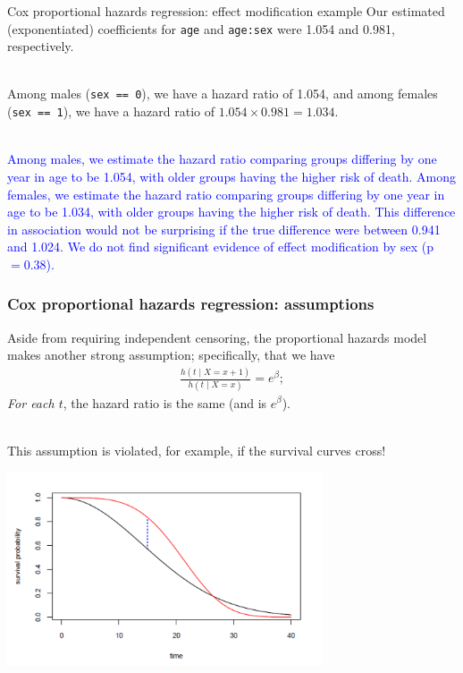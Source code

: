 \documentclass[10pt,t]{beamer}
\begin{document}
\begin{frame}{Cox proportional hazards regression: effect modification example}
	Our estimated (exponentiated) coefficients for \texttt{age} and \texttt{age:sex} were 1.054 and 0.981, respectively.
	\\ ~\ 
	
	Among males (\texttt{sex == 0}), we have a hazard ratio of 1.054, and among females (\texttt{sex == 1}), we have a hazard ratio of $1.054 \times 0.981 = 1.034$.  
	\\ ~\ 
	
	\textcolor{blue}{Among males, we estimate the hazard ratio comparing groups differing by one year in age to be 1.054, with older groups having the higher risk of death. Among females, we estimate the hazard ratio comparing groups differing by one year in age to be 1.034, with older groups having the higher risk of death. This difference in association would not be surprising if the true difference were between 0.941 and 1.024. We do not find significant evidence of effect modification by sex (p $= 0.38$).}
\end{frame}

\begin{frame}
\frametitle{Cox proportional hazards regression: assumptions}
\vspace{-0.5cm}
Aside from requiring independent censoring, the proportional hazards model makes another strong assumption; specifically, that we have
\begin{align*}
\frac{h(t \mid X = x + 1)}{h(t \mid X = x)}=  e^{\beta};
\end{align*}
\textit{For each $t$}, the hazard ratio is the same (and is $e^{\beta}$).
\\ ~\ 

This assumption is violated, for example, if the survival curves cross! 
\begin{center}
	\includegraphics[width = 0.7\textwidth]{figs/crossing_hazards.png}
\end{center}
\end{frame}
\end{document}
